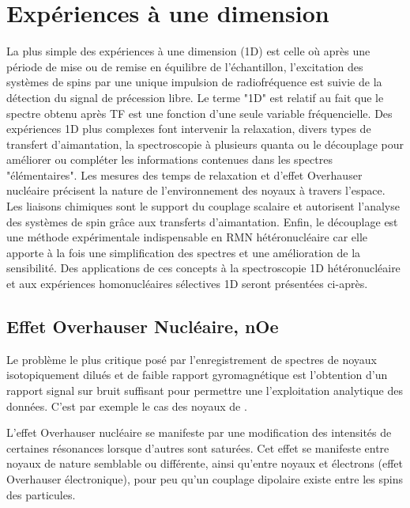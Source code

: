 \chapter[RMN 1D]{Expériences à une dimension}

La plus simple des expériences à une dimension (1D) est celle où après
une période de mise ou de remise en équilibre de l'échantillon, 
l'excitation des systèmes de spins par une unique impulsion 
de radiofréquence est suivie de la détection du signal de précession libre.
Le terme "1D" est relatif au fait que le spectre obtenu après TF
est une fonction d'une seule variable fréquencielle.
Des expériences 1D plus complexes font intervenir la relaxation,
divers types de transfert d'aimantation, la spectroscopie à plusieurs quanta
ou le découplage pour améliorer ou compléter les informations contenues dans
les spectres "élémentaires".
Les mesures des temps de relaxation et d'effet Overhauser nucléaire précisent 
la nature de l'environnement des noyaux à travers l'espace.
Les liaisons chimiques sont le support du couplage scalaire et autorisent
l'analyse des systèmes de spin grâce aux transferts d'aimantation. 
Enfin, le découplage est une méthode expérimentale indispensable
en RMN hétéronucléaire car elle apporte à la fois une simplification
des spectres et une amélioration de la sensibilité.
Des applications de ces concepts à la spectroscopie 1D hétéronucléaire
et aux expériences homonucléaires sélectives 1D seront présentées ci-après.

\section{Effet Overhauser Nucléaire, nOe}
\label{sec:noe}
Le problème le plus critique posé par l'enregistrement de spectres 
de noyaux isotopiquement dilués et de faible rapport gyromagnétique 
est l'obtention d'un rapport signal sur bruit suffisant pour permettre
une l'exploitation analytique des données.
C'est par exemple le cas des noyaux de \carb.

L'effet Overhauser nucléaire se manifeste par une modification des 
intensités de certaines résonances lorsque d'autres sont saturées.
Cet effet se manifeste entre noyaux de nature semblable ou différente,
ainsi qu'entre noyaux et électrons (effet Overhauser électronique),
pour peu qu'un couplage dipolaire existe entre les spins des particules.

